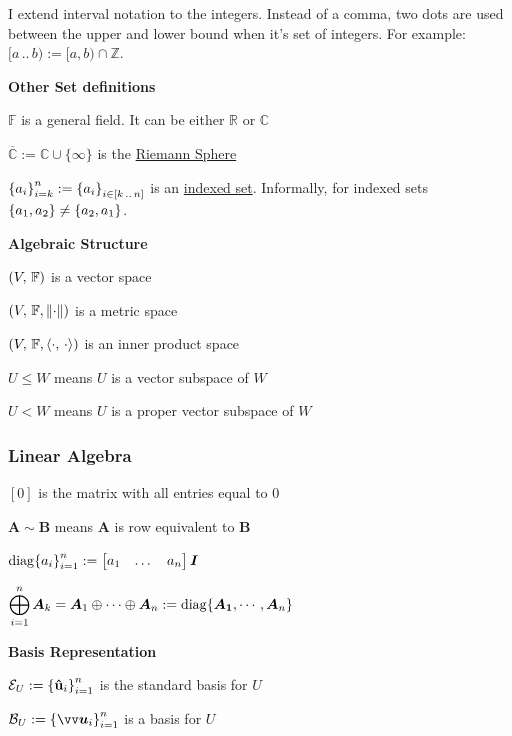 \documentclass[11pt]{article}
\begin{document}
  I extend interval notation to the integers. Instead of a comma, two dots are used between the upper and lower bound when it's set
  of integers. For example: \([a\,..\,b) := [a, b) \cap \mathbb{Z}\).

  \textbf{Other Set definitions}

  \(\mathbb{F}\) is a general field. It can be either \(\mathbb{R}\) or \(\mathbb{C}\)

  \(\overbar{\mathbb{C}} := \mathbb{C} \cup \{\infty\}\) is the \href{https://www.wikiwand.com/en/Riemann_sphere}{Riemann Sphere}

  \({\left\{ a_i \right\}}_{i = k}^n := {\left\{ a_i \right\}}_{i \in [k\,..\,n]}\) is an \href{https://www.wikiwand.com/en/Index_set}{indexed set}.
  Informally, for indexed sets \({\left\{ a_1, a_2 \right\}} \neq {\left\{ a_2, a_1 \right\}}\).

  \textbf{Algebraic Structure}

  \({\left( V,\, \mathbb{F} \right)}\) is a vector space

  \({\left( V,\, \mathbb{F}, \left\lVert\cdot\right\rVert \right)}\) is a metric space

  \({\left( V,\, \mathbb{F}, \left\langle\cdot,\, \cdot\right\rangle \right)}\) is an inner product space

  \(U \le W\) means \(U\) is a vector subspace of \(W\)

  \(U < W\) means \(U\) is a proper vector subspace of \(W\)

  \pagebreak

  \subsubsection{Linear Algebra}

  \([0]\) is the matrix with all entries equal to \(0\)

  \(\bm{A} \sim \bm{B}\) means \(\bm{A}\) is row equivalent to \(\bm{B}\)

  \(\mathrm{diag}{\left\{ a_i \right\}}_{i = 1}^n :=
  \begin{bmatrix} a_1 & \dots & a_n\end{bmatrix} \bm{I}\)

  \(\displaystyle \bigoplus_{i = 1}^n \bm{A}_k = \bm{A}_1 \oplus \cdots \oplus \bm{A}_n := \mathrm{diag}{\left\{ \bm{A_1}, \cdots, \bm{A}_n \right\}}\)

  \vspace{12pt}

  \textbf{Basis Representation}

  \(\mathcal{E}_U := {\left\{ \vu{u}_i \right\}}_{i = 1}^n\) is the standard basis for \(U\)

  \(\mathcal{B}_U := \brc{\vect{u}_i}_{i = 1}^n\) is a basis for \(U\)
\end{document}
